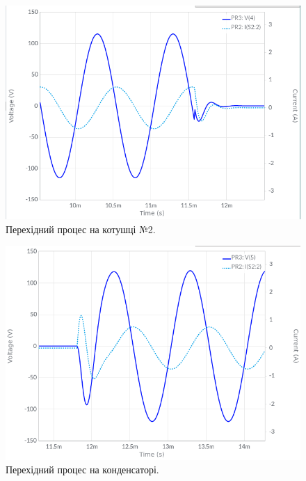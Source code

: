 \documentclass{article}
\begin{document}
\begin{normalsize}
	\begin{figure}[H]
		\centering
		\includegraphics[scale=0.5]{32}
		\caption{Перехідний процес на котушці №2.}
	\end{figure}

	\begin{figure}[H]
		\centering
		\includegraphics[scale=0.5]{41}
		\caption{Перехідний процес на конденсаторі.}
	\end{figure}
	

\end{normalsize}
\end{document}
